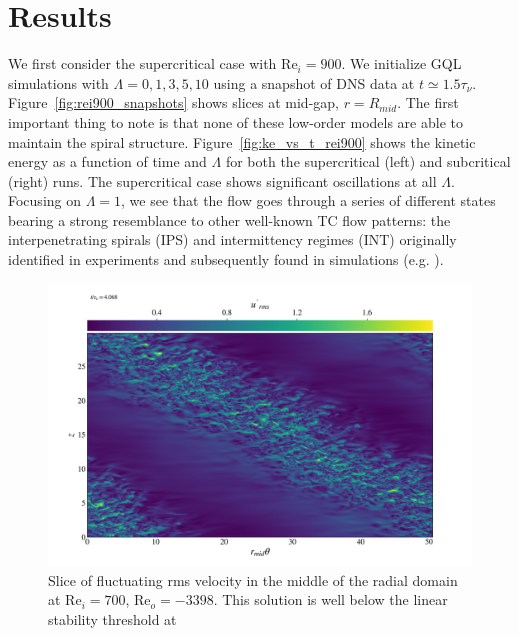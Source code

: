 \documentclass[openacc]{rstransa}%
\newcommand{\Reyn}{\mathrm{Re}}
\begin{document}
\section{Results}
\label{sec:nonlinear}

We first consider the supercritical case with $\Reyn_i = 900$. We initialize GQL simulations with $\Lambda = 0, 1, 3, 5, 10$ using a snapshot of DNS data at $t \simeq 1.5 \tau_\nu$.  Figure~\ref{fig:rei900_snapshots} shows slices at mid-gap, $r = R_{mid}$. The first important thing to note is that none of these low-order models are able to maintain the spiral structure. Figure~\ref{fig:ke_vs_t_rei900} shows the kinetic energy as a function of time and $\Lambda$ for both the supercritical (left) and subcritical (right) runs. 
The supercritical case shows significant oscillations at all $\Lambda$. Focusing on $\Lambda=1$, we see that the flow goes through a series of different states bearing a strong resemblance to other well-known TC flow patterns: the interpenetrating spirals (IPS) and intermittency regimes (INT) originally identified in experiments \cite{1984JFM...146...45M} and subsequently found in simulations (e.g. \cite{2009PhRvE..80d6315M}). 
\begin{figure}
    \centering
    \includegraphics[width=\textwidth]{../figs/urms_tz_rei_700_reo-3398_000278.png}
    \caption{Slice of fluctuating rms velocity in the middle of the radial domain at $\Reyn_i = 700$, $\Reyn_o = -3398$. This solution is well below the linear stability threshold at }
    \label{fig:urms_tz_rei700}
\end{figure}
\end{document}
